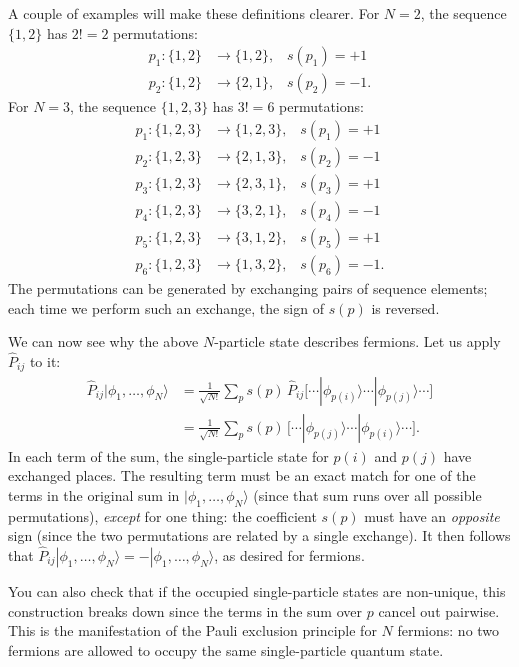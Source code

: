\documentclass[pra,12pt]{revtex4}
\begin{document}
A couple of examples will make these definitions clearer.  For $N=2$,
the sequence $\{1,2\}$ has $2! = 2$ permutations:
$$\begin{aligned}p_1 : \{1,2\} &\rightarrow \{1,2\}, \;\;\;s(p_1) = +1 \\ p_2 : \{1,2\} &\rightarrow \{2,1\}, \;\;\;s(p_2) = -1.\end{aligned}$$
For $N=3$, the sequence $\{1,2,3\}$ has $3!=6$ permutations:
$$\begin{aligned}
  p_1 : \{1,2,3\} &\rightarrow \{1,2,3\}, \;\;\;s(p_1) = +1 \\
  p_2 : \{1,2,3\} &\rightarrow \{2,1,3\}, \;\;\;s(p_2) = -1 \\
  p_3 : \{1,2,3\} &\rightarrow \{2,3,1\}, \;\;\;s(p_3) = +1 \\
  p_4 : \{1,2,3\} &\rightarrow \{3,2,1\}, \;\;\;s(p_4) = -1 \\
  p_5 : \{1,2,3\} &\rightarrow \{3,1,2\}, \;\;\;s(p_5) = +1 \\
  p_6 : \{1,2,3\} &\rightarrow \{1,3,2\}, \;\;\;s(p_6) = -1.\end{aligned}$$
The permutations can be generated by exchanging pairs of sequence
elements; each time we perform such an exchange, the sign of $s(p)$
is reversed.

We can now see why the above $N$-particle state describes fermions.
Let us apply $\hat{P}_{ij}$ to it:
$$\begin{aligned}\hat{P}_{ij}|\phi_1,\dots,\phi_N\rangle &= \frac{1}{\sqrt{N!}} \sum_p s(p)\, \hat{P}_{ij} \big[\cdots |\phi_{p(i)}\rangle \cdots |\phi_{p(j)}\rangle \cdots\big] \\&= \frac{1}{\sqrt{N!}} \sum_p s(p)\, \big[\cdots |\phi_{p(j)}\rangle \cdots |\phi_{p(i)}\rangle \cdots\big].\end{aligned}$$
In each term of the sum, the single-particle state for $p(i)$ and
$p(j)$ have exchanged places.  The resulting term must be an exact
match for one of the terms in the original sum in
$|\phi_1,\dots,\phi_N\rangle$ (since that sum runs over all possible
permutations), \textit{except} for one thing: the coefficient $s(p)$
must have an \textit{opposite} sign (since the two permutations are
related by a single exchange).  It then follows that
$\hat{P}_{ij}|\phi_1,\dots,\phi_N\rangle = -
|\phi_1,\dots,\phi_N\rangle$, as desired for fermions.

You can also check that if the occupied single-particle states are
non-unique, this construction breaks down since the terms in the sum
over $p$ cancel out pairwise.  This is the manifestation of the Pauli
exclusion principle for $N$ fermions: no two fermions are allowed to
occupy the same single-particle quantum state.
\end{document}
